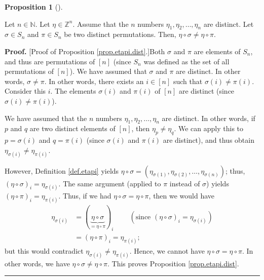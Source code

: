 \documentclass
[numbers=enddot,12pt,final,onecolumn,notitlepage,english]{scrartcl}%
\theoremstyle{definition}
\newtheorem{prop}[theo]{Proposition}
\newenvironment{proposition}[1][]
{\begin{prop}[#1]\begin{leftbar}}
{\end{leftbar}\end{prop}}
\newenvironment{proof}[1][Proof]{\noindent\textbf{#1.} }{\ \rule{0.5em}{0.5em}}
\newenvironment{verlong}{}{}
\begin{document}
\begin{proposition}
\label{prop.etapi.dist}Let $n\in\mathbb{N}$. Let $\eta\in\mathbb{Z}^{n}$.
Assume that the $n$ numbers $\eta_{1},\eta_{2},\ldots,\eta_{n}$ are distinct.
Let $\sigma\in S_{n}$ and $\pi\in S_{n}$ be two distinct permutations. Then,
$\eta\circ\sigma\neq\eta\circ\pi$.
\end{proposition}

\begin{verlong}
\begin{proof}
[Proof of Proposition \ref{prop.etapi.dist}.]Both $\sigma$ and $\pi$ are
elements of $S_{n}$, and thus are permutations of $\left[  n\right]  $ (since
$S_{n}$ was defined as the set of all permutations of $\left[  n\right]  $).
We have assumed that $\sigma$ and $\pi$ are distinct. In other words,
$\sigma\neq\pi$. In other words, there exists an $i\in\left[  n\right]  $ such
that $\sigma\left(  i\right)  \neq\pi\left(  i\right)  $. Consider this $i$.
The elements $\sigma\left(  i\right)  $ and $\pi\left(  i\right)  $ of
$\left[  n\right]  $ are distinct (since $\sigma\left(  i\right)  \neq
\pi\left(  i\right)  $).

We have assumed that the $n$ numbers $\eta_{1},\eta_{2},\ldots,\eta_{n}$ are
distinct. In other words, if $p$ and $q$ are two distinct elements of $\left[
n\right]  $, then $\eta_{p}\neq\eta_{q}$. We can apply this to $p=\sigma
\left(  i\right)  $ and $q=\pi\left(  i\right)  $ (since $\sigma\left(
i\right)  $ and $\pi\left(  i\right)  $ are distinct), and thus obtain
$\eta_{\sigma\left(  i\right)  }\neq\eta_{\pi\left(  i\right)  }$.

However, Definition \ref{def.etapi} yields $\eta\circ\sigma=\left(
\eta_{\sigma\left(  1\right)  },\eta_{\sigma\left(  2\right)  },\ldots
,\eta_{\sigma\left(  n\right)  }\right)  $; thus, $\left(  \eta\circ
\sigma\right)  _{i}=\eta_{\sigma\left(  i\right)  }$. The same argument
(applied to $\pi$ instead of $\sigma$) yields $\left(  \eta\circ\pi\right)
_{i}=\eta_{\pi\left(  i\right)  }$. Thus, if we had $\eta\circ\sigma=\eta
\circ\pi$, then we would have%
\begin{align*}
\eta_{\sigma\left(  i\right)  }  &  =\left(  \underbrace{\eta\circ\sigma
}_{=\eta\circ\pi}\right)  _{i}\ \ \ \ \ \ \ \ \ \ \left(  \text{since }\left(
\eta\circ\sigma\right)  _{i}=\eta_{\sigma\left(  i\right)  }\right) \\
&  =\left(  \eta\circ\pi\right)  _{i}=\eta_{\pi\left(  i\right)  };
\end{align*}
but this would contradict $\eta_{\sigma\left(  i\right)  }\neq\eta_{\pi\left(
i\right)  }$. Hence, we cannot have $\eta\circ\sigma=\eta\circ\pi$. In other
words, we have $\eta\circ\sigma\neq\eta\circ\pi$. This proves Proposition
\ref{prop.etapi.dist}.
\end{proof}
\end{verlong}
\end{document}
